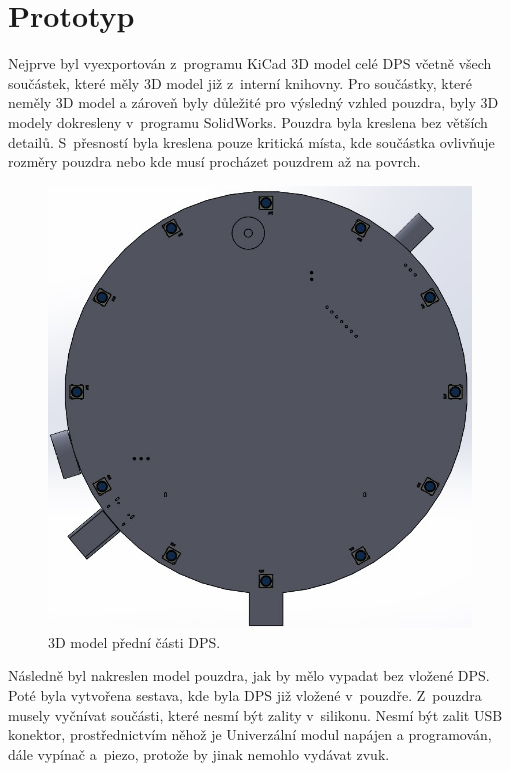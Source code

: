 \section{Prototyp}
Nejprve byl vyexportován z~programu KiCad 3D model celé DPS včetně všech součástek, které měly 3D model již z~interní knihovny. Pro součástky, které neměly 3D model a zároveň byly důležité 
pro výsledný vzhled pouzdra, byly 3D modely dokresleny v~programu SolidWorks. Pouzdra byla kreslena bez větších detailů. S~přesností byla kreslena pouze kritická místa, kde součástka ovlivňuje 
rozměry pouzdra nebo kde musí procházet pouzdrem až na povrch.
  
\begin{figure}[!h]
  \begin{center}
    \includegraphics[scale=0.4]{obrazky/3D_model_predni.jpg}
  \end{center}
  \caption[3D model přední části DPS]{3D model přední části DPS.}
\end{figure}

Následně byl nakreslen model pouzdra, jak by mělo vypadat bez vložené DPS. Poté byla vytvořena sestava, kde byla DPS již vložené v~pouzdře. Z~pouzdra musely vyčnívat součásti, které nesmí být 
zality v~silikonu. Nesmí být zalit USB konektor, prostřednictvím něhož je Univerzální modul napájen a programován, dále vypínač a~piezo, protože by jinak nemohlo vydávat zvuk. 

